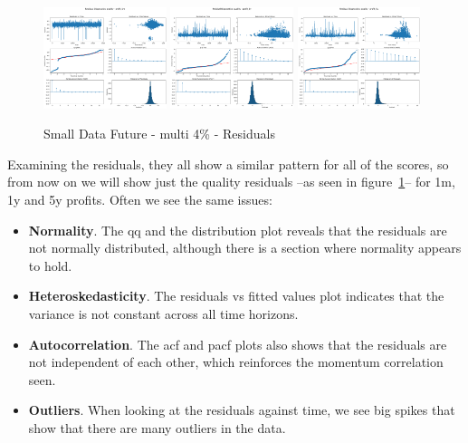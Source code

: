 \documentclass[11pt,english,a4paper,hidelinks]{book}
\begin{document}
\begin{figure}[H]
    \centering
    \includegraphics[width=0.32\textwidth]{images/code/models/linear_regression/first_model/Multi/quality_profit_1m_residuals.png}
    \includegraphics[width=0.32\textwidth]{images/code/models/linear_regression/first_model/Multi/quality_profit_1y_residuals.png}
    \includegraphics[width=0.32\textwidth]{images/code/models/linear_regression/first_model/Multi/quality_profit_5y_residuals.png}
    \caption{Small Data Future - \acrshort{multi} 4\% - Residuals}
    \label{fig:first_linear_regression_residuals}
\end{figure}

\noindent Examining the residuals, they all show a similar pattern for all of the scores, so from now on we will show just the quality residuals --as seen in figure~\ref{fig:first_linear_regression_residuals}-- for 1m, 1y and 5y profits. Often we see the same issues:
\begin{itemize}
    \item \textbf{Normality}. The \acrshort{qq} and the distribution plot reveals that the residuals are not normally distributed, although there is a section where normality appears to hold.
    \item \textbf{Heteroskedasticity}. The residuals vs fitted values plot indicates that the variance is not constant across all time horizons.
    \item \textbf{Autocorrelation}. The \acrshort{acf} and \acrshort{pacf} plots also shows that the residuals are not independent of each other, which reinforces the momentum correlation seen.
    \item \textbf{Outliers}. When looking at the residuals against time, we see big spikes that show that there are many outliers in the data.
\end{itemize}
\end{document}

